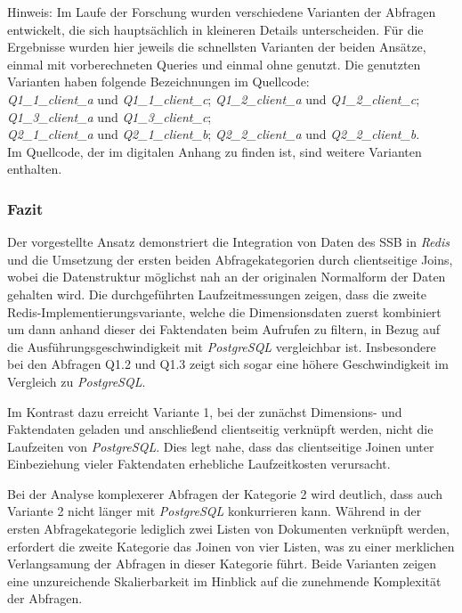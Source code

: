 Hinweis: Im Laufe der Forschung wurden verschiedene Varianten der Abfragen entwickelt, die sich hauptsächlich in kleineren Details unterscheiden. Für die Ergebnisse wurden hier jeweils die schnellsten Varianten der beiden Ansätze, einmal mit vorberechneten Queries und einmal ohne genutzt. Die genutzten Varianten haben folgende Bezeichnungen im Quellcode:\\
\emph{Q1\_1\_client\_a} und \emph{Q1\_1\_client\_c}; \emph{Q1\_2\_client\_a} und \emph{Q1\_2\_client\_c};\\ \emph{Q1\_3\_client\_a} und \emph{Q1\_3\_client\_c};\\ \emph{Q2\_1\_client\_a} und \emph{Q2\_1\_client\_b}; \emph{Q2\_2\_client\_a} und \emph{Q2\_2\_client\_b}.
\\Im Quellcode, der im digitalen Anhang zu finden ist, sind weitere Varianten enthalten. %


\subsubsection{Fazit}
Der vorgestellte Ansatz demonstriert die Integration von Daten des \ac{SSB} in \emph{Redis} und die Umsetzung der ersten beiden Abfragekategorien durch clientseitige Joins, wobei die Datenstruktur möglichst nah an der originalen Normalform der Daten gehalten wird. Die durchgeführten Laufzeitmessungen zeigen, dass die zweite Redis-Implementierungsvariante, welche die Dimensionsdaten zuerst kombiniert um dann anhand dieser dei Faktendaten beim Aufrufen zu filtern, in Bezug auf die Ausführungsgeschwindigkeit mit \emph{PostgreSQL} vergleichbar ist. Insbesondere bei den Abfragen Q1.2 und Q1.3 zeigt sich sogar eine höhere Geschwindigkeit im Vergleich zu \emph{PostgreSQL}.

Im Kontrast dazu erreicht Variante 1, bei der zunächst Dimensions- und Faktendaten geladen und anschließend clientseitig verknüpft werden, nicht die Laufzeiten von \emph{PostgreSQL}. Dies legt nahe, dass das clientseitige Joinen unter Einbeziehung vieler Faktendaten erhebliche Laufzeitkosten verursacht.

Bei der Analyse komplexerer Abfragen der Kategorie 2 wird deutlich, dass auch Variante 2 nicht länger mit \emph{PostgreSQL} konkurrieren kann. Während in der ersten Abfragekategorie lediglich zwei Listen von Dokumenten verknüpft werden, erfordert die zweite Kategorie das Joinen von vier Listen, was zu einer merklichen Verlangsamung der Abfragen in dieser Kategorie führt. Beide Varianten zeigen eine unzureichende Skalierbarkeit im Hinblick auf die zunehmende Komplexität der Abfragen.

